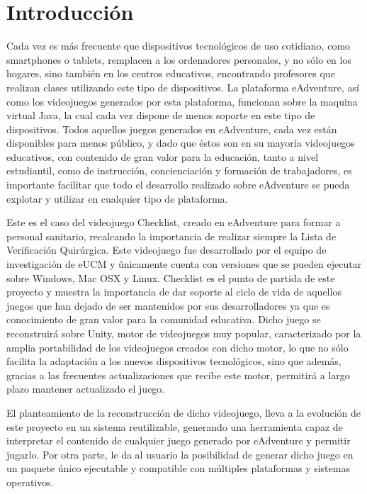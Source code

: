 \cleardoublepage

\chapter{Introducción}
\label{introduccion}

Cada vez es más frecuente que dispositivos tecnológicos de uso cotidiano, como smartphones o tablets, remplacen a los ordenadores personales, y no sólo en los hogares, sino también en los centros educativos, encontrando profesores que realizan clases utilizando este tipo de dispositivos. La plataforma eAdventure, así como los videojuegos generados por esta plataforma, funcionan sobre la maquina virtual Java, la cual cada vez dispone de menos soporte en este tipo de dispositivos. Todos aquellos juegos generados en eAdventure, cada vez están disponibles para menos público, y dado que éstos son en su mayoría videojuegos educativos, con contenido de gran valor para la educación, tanto a nivel estudiantil, como de instrucción, concienciación y formación de trabajadores, es importante facilitar que todo el desarrollo realizado sobre eAdventure se pueda explotar y utilizar en cualquier tipo de plataforma.

Este es el caso del videojuego Checklist, creado en eAdventure para formar a personal sanitario, recalcando la importancia de realizar siempre la Lista de Verificación Quirúrgica. Este videojuego fue desarrollado por el equipo de investigación de eUCM y únicamente cuenta con versiones que se pueden ejecutar sobre Windows, Mac OSX y Linux. Checklist es el punto de partida de este proyecto y muestra la importancia de dar soporte al ciclo de vida de aquellos juegos que han dejado de ser mantenidos por sus desarrolladores ya que es conocimiento de gran valor para la comunidad educativa. Dicho juego se reconstruirá sobre Unity, motor de videojuegos muy popular, caracterizado por la amplia portabilidad de los videojuegos creados con dicho motor, lo que no sólo facilita la adaptación a los nuevos dispositivos tecnológicos, sino que además, gracias a las frecuentes actualizaciones que recibe este motor, permitirá a largo plazo mantener actualizado el juego.

El planteamiento de la reconstrucción de dicho videojuego, lleva a la evolución de este proyecto en un sistema reutilizable, generando una herramienta capaz de interpretar el contenido de cualquier juego generado por eAdventure y permitir jugarlo. Por otra parte, le da al usuario la posibilidad de generar dicho juego en un paquete único ejecutable y compatible con múltiples plataformas y sistemas operativos.

